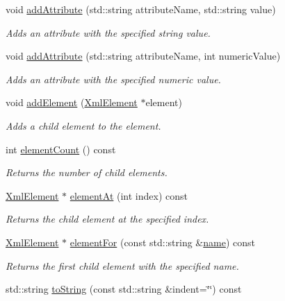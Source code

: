 \begin{DoxyCompactItemize}
\item 
void \hyperlink{class_xml_element_a14387be9ca6d014a38e95a7aa98f86c5}{add\+Attribute} (std\+::string attribute\+Name, std\+::string value)
\begin{DoxyCompactList}\small\item\em Adds an attribute with the specified string value. \end{DoxyCompactList}\item 
void \hyperlink{class_xml_element_aec69fb49cf9e563cff9858ddc818f055}{add\+Attribute} (std\+::string attribute\+Name, int numeric\+Value)
\begin{DoxyCompactList}\small\item\em Adds an attribute with the specified numeric value. \end{DoxyCompactList}\item 
void \hyperlink{class_xml_element_a444321a1de2a7f52994c53f9e6e0d942}{add\+Element} (\hyperlink{class_xml_element}{Xml\+Element} $\ast$element)
\begin{DoxyCompactList}\small\item\em Adds a child element to the element. \end{DoxyCompactList}\item 
int \hyperlink{class_xml_element_a2aad0dda599cb46f85ff6b4b897045b9}{element\+Count} () const 
\begin{DoxyCompactList}\small\item\em Returns the number of child elements. \end{DoxyCompactList}\item 
\hyperlink{class_xml_element}{Xml\+Element} $\ast$ \hyperlink{class_xml_element_a083d56e5d6e8ef4f4ed462b3206b3af2}{element\+At} (int index) const 
\begin{DoxyCompactList}\small\item\em Returns the child element at the specified index. \end{DoxyCompactList}\item 
\hyperlink{class_xml_element}{Xml\+Element} $\ast$ \hyperlink{class_xml_element_a6babcb48cd31c025234ad35db5ebce3e}{element\+For} (const std\+::string \&\hyperlink{class_xml_element_a924c45bc90419123174ac9d11089cb6d}{name}) const 
\begin{DoxyCompactList}\small\item\em Returns the first child element with the specified name. \end{DoxyCompactList}\item 
std\+::string \hyperlink{class_xml_element_a2e783a5fed6b5b31b2d11117e6c83d40}{to\+String} (const std\+::string \&indent=\char`\"{}\char`\"{}) const 

\end{DoxyCompactItemize}
